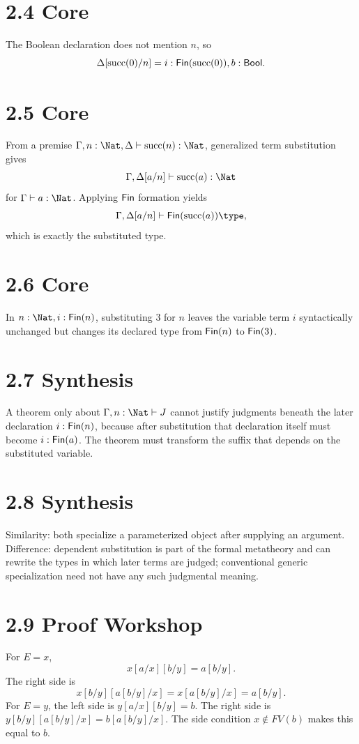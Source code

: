 \documentclass[11pt,openany]{book}
\begin{document}
\section*{2.4 Core}
The Boolean declaration does not mention $n$, so
\[
 \Delta[\mathrm{succ}(0)/n]
 = i:\mathsf{Fin}(\mathrm{succ}(0)),b:\mathsf{Bool}.
\]

\section*{2.5 Core}
From a premise $\Gamma,n:\Nat,\Delta\vdash \mathrm{succ}(n):\Nat$, generalized term substitution gives
\[
 \Gamma,\Delta[a/n]\vdash \mathrm{succ}(a):\Nat
\]
for $\Gamma\vdash a:\Nat$. Applying $\mathsf{Fin}$ formation yields
\[
 \Gamma,\Delta[a/n]\vdash \Fin(\mathrm{succ}(a))\type,
\]
which is exactly the substituted type.

\section*{2.6 Core}
In $n:\Nat,i:\Fin(n)$, substituting $3$ for $n$ leaves the variable term $i$ syntactically unchanged but changes its declared type from $\mathsf{Fin}(n)$ to $\mathsf{Fin}(3)$.

\section*{2.7 Synthesis}
A theorem only about $\Gamma,n:\Nat\vdash J$ cannot justify judgments beneath the later declaration $i:\mathsf{Fin}(n)$, because after substitution that declaration itself must become $i:\mathsf{Fin}(a)$. The theorem must transform the suffix that depends on the substituted variable.

\section*{2.8 Synthesis}
Similarity: both specialize a parameterized object after supplying an argument. Difference: dependent substitution is part of the formal metatheory and can rewrite the types in which later terms are judged; conventional generic specialization need not have any such judgmental meaning.

\section*{2.9 Proof Workshop}
For $E=x$,
\[
 x[a/x][b/y]=a[b/y].
\]
The right side is
\[
 x[b/y][a[b/y]/x]=x[a[b/y]/x]=a[b/y].
\]
For $E=y$, the left side is $y[a/x][b/y]=b$. The right side is $y[b/y][a[b/y]/x]=b[a[b/y]/x]$. The side condition $x\notin FV(b)$ makes this equal to $b$.
\end{document}
